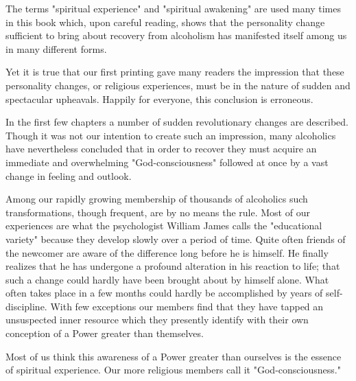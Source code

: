 


\bbChapterPreamble




\begin{biblechapter}
    The terms "spiritual experience" 
    and "spiritual awakening" are used many times in this book 
    which, upon careful reading, 
    shows that the personality change 
    sufficient to bring about recovery from alcoholism has manifested
    itself among us in many different forms.

Yet it is true that our first printing 
    gave many readers the impression that these personality changes, 
    or religious experiences, 
    must be in the nature of sudden and spectacular upheavals.
\verse Happily for everyone, this conclusion is erroneous.

\verse In the first few chapters 
    a number of sudden revolutionary changes are described.
\verse Though it was not our intention to create such an impression, 
    many alcoholics have nevertheless concluded that 
    in order to recover they must acquire an immediate and overwhelming 
    "God-consciousness" 
    followed at once by a vast change in feeling and outlook.
\end{biblechapter}


\begin{biblechapter}
    Among our rapidly growing membership of thousands of alcoholics 
    such transformations, though frequent, are by no means the rule.
\verse Most of our experiences
    are what the psychologist William James calls 
    the "educational variety" 
    because they develop slowly over a period of time.
\verse Quite often friends of the newcomer are aware of the difference 
    long before he is himself.
\verse He finally realizes that he has undergone a profound alteration 
    in his reaction to life; 
    that such a change could hardly have been brought about 
    by himself alone.
\verse What often takes place in a few months 
    could hardly be accomplished by years of self-discipline.
\verse With few exceptions our members find 
    that they have tapped an unsuspected inner resource 
    which they presently identify with 
    their own conception of a Power greater than themselves.
 
Most of us think this awareness of a Power greater than ourselves 
    is the essence of spiritual experience.
\verse Our more religious members call it "God-consciousness."
\end{biblechapter}


